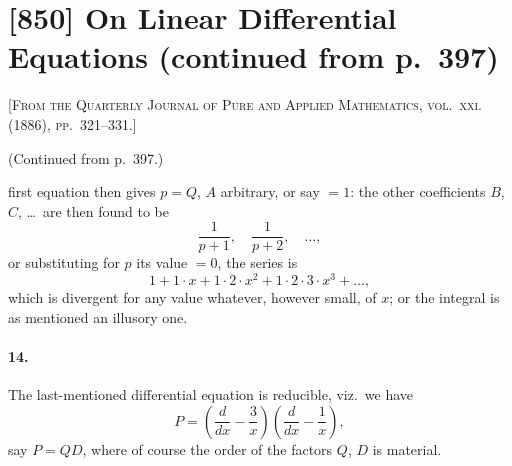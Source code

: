 \documentclass[11pt,a4paper]{book}
\begin{document}
\newpage
\clearpage


\thispagestyle{empty}


\newpage

\section*{[850] On Linear Differential Equations (continued from p.~397)}

\noindent\textsc{[From the Quarterly Journal of Pure and Applied Mathematics, vol.~xxi. (1886), pp.~321--331.]}

\smallskip

\noindent (Continued from p.~397.)

\bigskip

first equation then gives $p = Q$, $A$ arbitrary, or say $=1$: the other coefficients $B$, $C$, \ldots\ are then found to be
\[
\frac{1}{p+1}, \quad \frac{1}{p+2}, \quad \ldots,
\]
or substituting for $p$ its value $=0$, the series is
\[
1 + 1\cdot x + 1\cdot 2\cdot x^{2} + 1\cdot 2\cdot 3\cdot x^{3} + \ldots,
\]
which is divergent for any value whatever, however small, of $x$; or the integral is as mentioned an illusory one.

\paragraph{14.} The last-mentioned differential equation is reducible, viz.\ we have
\[
P = \left(\frac{d}{dx} - \frac{3}{x}\right)\left(\frac{d}{dx} - \frac{1}{x}\right),
\]
say $P = QD$, where of course the order of the factors $Q$, $D$ is material.
\end{document}
